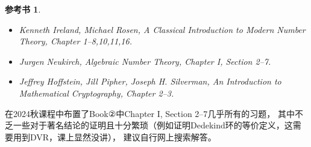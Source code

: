 \newcommand{\bbZ}{\mathbb{Z}}
\newcommand{\bbQ}{\mathbb{Q}}
\newcommand{\bbN}{\mathbb{N}}
\newcommand{\bbC}{\mathbb{C}}
\newcommand{\bbF}{\mathbb{F}}
\newcommand{\LHS}{\operatorname{LHS}}
\newtheorem{exercise}{练习}
\newtheorem*{books}{参考书}
\newtheorem*{definition*}{定义}

\begin{books}
\begin{itemize}
    \item[①] Kenneth Ireland, Michael Rosen, \textit{A Classical Introduction to Modern Number Theory}, Chapter 1--8,10,11,16.\\
    \item[②] Jurgen Neukirch, \textit{Algebraic Number Theory}, Chapter I, Section 2--7. \\
    \item[③] Jeffrey Hoffstein, Jill Pipher, Joseph H. Silverman, \textit{An Introduction to Mathematical Cryptography}, Chapter 2--3. \\
\end{itemize}
\end{books}

\begin{remark}
    在2024秋课程中布置了Book②中Chapter I, Section 2--7几乎所有的习题，
    其中不乏一些对于著名结论的证明且十分繁琐（例如证明Dedekind环的等价定义，这需要用到DVR，课上显然没讲），
    建议自行网上搜索解答。
\end{remark}

